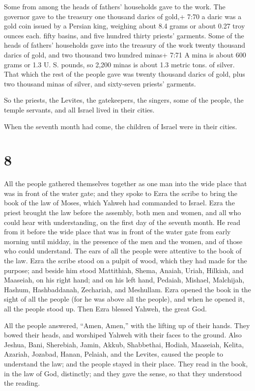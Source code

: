  Some from among the heads of fathers' households gave to
the work. The governor gave to the treasury one thousand darics of
gold,+ 7:70 a daric was a gold coin issued by a Persian king, weighing
about 8.4 grams or about 0.27 troy ounces each. fifty basins, and five
hundred thirty priests' garments.  Some of the heads of
fathers' households gave into the treasury of the work twenty thousand
darics of gold, and two thousand two hundred minas+ 7:71 A mina is about
600 grams or 1.3 U. S. pounds, so 2,200 minas is about 1.3 metric tons.
of silver.  That which the rest of the people gave was
twenty thousand darics of gold, plus two thousand minas of silver, and
sixty-seven priests' garments.

 So the priests, the Levites, the gatekeepers, the singers,
some of the people, the temple servants, and all Israel lived in their
cities.

When the seventh month had come, the children of Israel were in their
cities.

\hypertarget{section-7}{%
\section{8}\label{section-7}}

 All the people gathered themselves together as one man into
the wide place that was in front of the water gate; and they spoke to
Ezra the scribe to bring the book of the law of Moses, which Yahweh had
commanded to Israel.  Ezra the priest brought the law before
the assembly, both men and women, and all who could hear with
understanding, on the first day of the seventh month.  He
read from it before the wide place that was in front of the water gate
from early morning until midday, in the presence of the men and the
women, and of those who could understand. The ears of all the people
were attentive to the book of the law.  Ezra the scribe
stood on a pulpit of wood, which they had made for the purpose; and
beside him stood Mattithiah, Shema, Anaiah, Uriah, Hilkiah, and
Maaseiah, on his right hand; and on his left hand, Pedaiah, Mishael,
Malchijah, Hashum, Hashbaddanah, Zechariah, and Meshullam. 
Ezra opened the book in the sight of all the people (for he was above
all the people), and when he opened it, all the people stood up.
 Then Ezra blessed Yahweh, the great God.

All the people answered, ``Amen, Amen,'' with the lifting up of their
hands. They bowed their heads, and worshiped Yahweh with their faces to
the ground.  Also Jeshua, Bani, Sherebiah, Jamin, Akkub,
Shabbethai, Hodiah, Maaseiah, Kelita, Azariah, Jozabad, Hanan, Pelaiah,
and the Levites, caused the people to understand the law; and the people
stayed in their place.  They read in the book, in the law of
God, distinctly; and they gave the sense, so that they understood the
reading.

